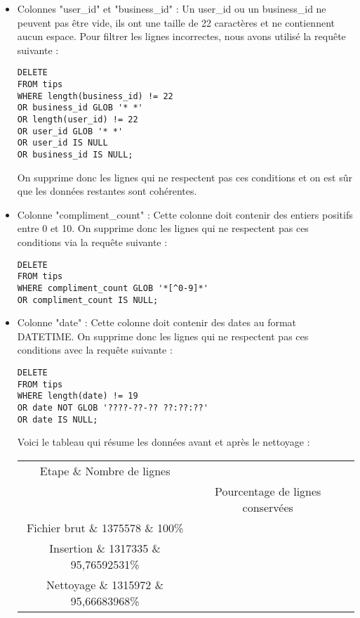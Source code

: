 \begin{itemize}
\item Colonnes "user\_id" et "business\_id" : Un user\_id ou un business\_id ne peuvent pas être vide, ils ont une taille de 22 caractères et ne contiennent aucun espace.
Pour filtrer les lignes incorrectes, nous avons utilisé la requête suivante :

\begin{verbatim}
DELETE
FROM tips
WHERE length(business_id) != 22
OR business_id GLOB '* *'
OR length(user_id) != 22
OR user_id GLOB '* *'
OR user_id IS NULL
OR business_id IS NULL;
\end{verbatim}

On supprime donc les lignes qui ne respectent pas ces conditions et on est sûr que les données restantes sont cohérentes.

\item Colonne "compliment_count" : Cette colonne doit contenir des entiers positifs entre 0 et 10. On supprime donc les lignes qui ne respectent pas ces conditions via la requête suivante :

\begin{verbatim}
DELETE
FROM tips
WHERE compliment_count GLOB '*[^0-9]*'
OR compliment_count IS NULL;
\end{verbatim}

\item Colonne "date" : Cette colonne doit contenir des dates au format DATETIME. On supprime donc les lignes qui ne respectent pas ces conditions avec la requête suivante :

\begin{verbatim}
DELETE
FROM tips
WHERE length(date) != 19
OR date NOT GLOB '????-??-?? ??:??:??'
OR date IS NULL;
\end{verbatim}


Voici le tableau qui résume les données avant et après le nettoyage :

\begin{center}
\begin{tabular}{|c|c|c|}
\hline
Etape \& Nombre de lignes \\& Pourcentage de lignes conservées \\
\hline
Fichier brut \& 1375578 \& 100\% \\
\hline
Insertion \& 1317335 \& 95,76592531\% \\
\hline
Nettoyage \& 1315972 \& 95,66683968\% \\
\hline
\end{tabular}
\end{center}


\end{itemize}
